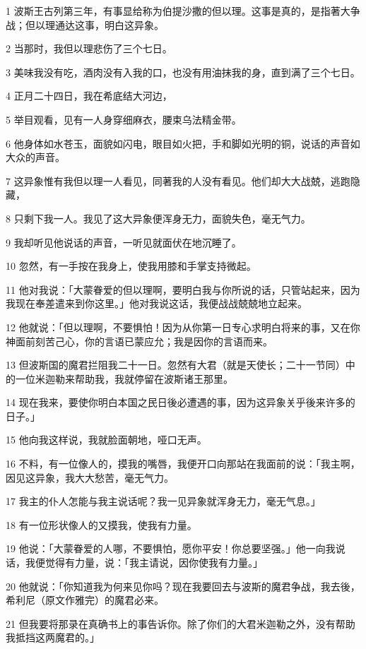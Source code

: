 \par 1 波斯王古列第三年，有事显给称为伯提沙撒的但以理。这事是真的，是指著大争战；但以理通达这事，明白这异象。
\par 2 当那时，我但以理悲伤了三个七日。
\par 3 美味我没有吃，酒肉没有入我的口，也没有用油抹我的身，直到满了三个七日。
\par 4 正月二十四日，我在希底结大河边，
\par 5 举目观看，见有一人身穿细麻衣，腰束乌法精金带。
\par 6 他身体如水苍玉，面貌如闪电，眼目如火把，手和脚如光明的铜，说话的声音如大众的声音。
\par 7 这异象惟有我但以理一人看见，同著我的人没有看见。他们却大大战兢，逃跑隐藏，
\par 8 只剩下我一人。我见了这大异象便浑身无力，面貌失色，毫无气力。
\par 9 我却听见他说话的声音，一听见就面伏在地沉睡了。
\par 10 忽然，有一手按在我身上，使我用膝和手掌支持微起。
\par 11 他对我说：「大蒙眷爱的但以理啊，要明白我与你所说的话，只管站起来，因为我现在奉差遣来到你这里。」他对我说这话，我便战战兢兢地立起来。
\par 12 他就说：「但以理啊，不要惧怕！因为从你第一日专心求明白将来的事，又在你神面前刻苦己心，你的言语已蒙应允；我是因你的言语而来。
\par 13 但波斯国的魔君拦阻我二十一日。忽然有大君（就是天使长；二十一节同）中的一位米迦勒来帮助我，我就停留在波斯诸王那里。
\par 14 现在我来，要使你明白本国之民日後必遭遇的事，因为这异象关乎後来许多的日子。」
\par 15 他向我这样说，我就脸面朝地，哑口无声。
\par 16 不料，有一位像人的，摸我的嘴唇，我便开口向那站在我面前的说：「我主啊，因见这异象，我大大愁苦，毫无气力。
\par 17 我主的仆人怎能与我主说话呢？我一见异象就浑身无力，毫无气息。」
\par 18 有一位形状像人的又摸我，使我有力量。
\par 19 他说：「大蒙眷爱的人哪，不要惧怕，愿你平安！你总要坚强。」他一向我说话，我便觉得有力量，说：「我主请说，因你使我有力量。」
\par 20 他就说：「你知道我为何来见你吗？现在我要回去与波斯的魔君争战，我去後，希利尼（原文作雅完）的魔君必来。
\par 21 但我要将那录在真确书上的事告诉你。除了你们的大君米迦勒之外，没有帮助我抵挡这两魔君的。」

